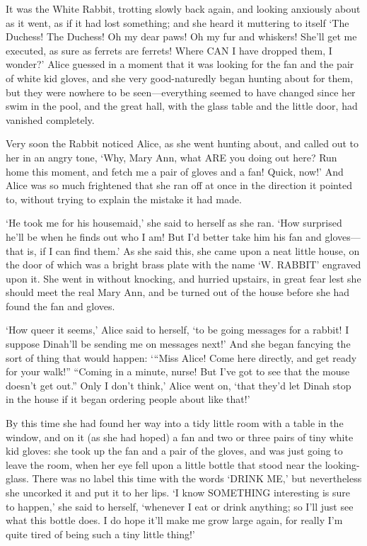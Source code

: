 \documentclass[12pt]{book}
\begin{document}
\begin{Parallel}[p]{}{}
{It was the White Rabbit, trotting slowly back again, and looking anxiously about as it went, as if it had lost something; and she heard it muttering to itself ‘The Duchess! The Duchess! Oh my dear paws! Oh my fur and whiskers! She’ll get me executed, as sure as ferrets are ferrets! Where CAN I have dropped them, I wonder?’ Alice guessed in a moment that it was looking for the fan and the pair of white kid gloves, and she very good-naturedly began hunting about for them, but they were nowhere to be seen—everything seemed to have changed since her swim in the pool, and the great hall, with the glass table and the little door, had vanished completely.

Very soon the Rabbit noticed Alice, as she went hunting about, and called out to her in an angry tone, ‘Why, Mary Ann, what ARE you doing out here? Run home this moment, and fetch me a pair of gloves and a fan! Quick, now!’ And Alice was so much frightened that she ran off at once in the direction it pointed to, without trying to explain the mistake it had made.

‘He took me for his housemaid,’ she said to herself as she ran. ‘How surprised he’ll be when he finds out who I am! But I’d better take him his fan and gloves—that is, if I can find them.’ As she said this, she came upon a neat little house, on the door of which was a bright brass plate with the name ‘W. RABBIT’ engraved upon it. She went in without knocking, and hurried upstairs, in great fear lest she should meet the real Mary Ann, and be turned out of the house before she had found the fan and gloves.

‘How queer it seems,’ Alice said to herself, ‘to be going messages for a rabbit! I suppose Dinah’ll be sending me on messages next!’ And she began fancying the sort of thing that would happen: ‘“Miss Alice! Come here directly, and get ready for your walk!” “Coming in a minute, nurse! But I’ve got to see that the mouse doesn’t get out.” Only I don’t think,’ Alice went on, ‘that they’d let Dinah stop in the house if it began ordering people about like that!’

By this time she had found her way into a tidy little room with a table in the window, and on it (as she had hoped) a fan and two or three pairs of tiny white kid gloves: she took up the fan and a pair of the gloves, and was just going to leave the room, when her eye fell upon a little bottle that stood near the looking-glass. There was no label this time with the words ‘DRINK ME,’ but nevertheless she uncorked it and put it to her lips. ‘I know SOMETHING interesting is sure to happen,’ she said to herself, ‘whenever I eat or drink anything; so I’ll just see what this bottle does. I do hope it’ll make me grow large again, for really I’m quite tired of being such a tiny little thing!’

}
\end{Parallel}
\end{document}
